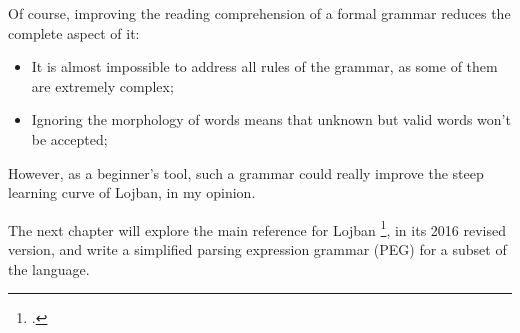 Of course, improving the reading comprehension of a formal grammar reduces the complete aspect of it:

\begin{itemize}
  \item It is almost impossible to address all rules of the grammar, as some of them are extremely complex;
  \item Ignoring the morphology of words means that unknown but valid words won't be accepted;
\end{itemize}

However, as a beginner's tool, such a grammar could really improve the steep learning curve of Lojban, in my opinion.\newline

The next chapter will explore the main reference for Lojban \footcite{cowan1997complete}, in its 2016 revised version, and write a simplified parsing expression grammar (PEG) for a subset of the language.


